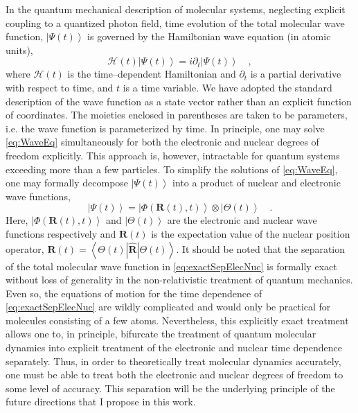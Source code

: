 \documentclass[12pt]{article}
\newcommand{\ket}[1]{\left\vert #1 \right\rangle}         %
\newcommand{\innerop}[3]{\left\langle #1 \left\vert #2 \right\vert #3 \right\rangle}  %
\newcommand*\vc[1]{\boldsymbol{#1}}
\begin{document}
In the quantum mechanical description of molecular systems, neglecting explicit
coupling to a quantized photon field, time evolution of the total molecular wave
function, $\ket{\Psi (t)}$ is governed by the Hamiltonian wave equation 
(in atomic units),
\begin{equation}
\mathscr{H}(t) \ket{\Psi (t)} = i\partial_t \ket{\Psi(t)} \quad,
\label{eq:WaveEq}
\end{equation}
where $\mathscr{H}(t)$ is the time--dependent Hamiltonian and $\partial_t$ is a
partial derivative with respect to time, and $t$ is a time variable. We have
adopted the standard description of the wave function as a state vector rather
than an explicit function of coordinates. The moieties enclosed in parentheses
are taken to be parameters, i.e. the wave function is parameterized by time.
In principle, one may solve \cref{eq:WaveEq} simultaneously for both the 
electronic and nuclear degrees of freedom explicitly. This approach is, however,
intractable for quantum systems exceeding more than a few particles. To simplify
the solutions of \cref{eq:WaveEq}, one may formally decompose $\ket{\Psi (t)}$
into a product of nuclear and electronic wave functions,
\begin{equation} 
\ket{\Psi (t)} = \ket{\Phi(\vc{R}(t),t)}\otimes\ket{\Theta(t)} 
\quad .  
\label{eq:exactSepElecNuc}
\end{equation} 
Here, $\ket{\Phi(\vc{R}(t),t)}$ and $\ket{\Theta (t)}$ are the electronic and
nuclear wave functions respectively and $\vc{R}(t)$ is the expectation value of
the nuclear position operator, $\vc{R}(t) =
\innerop{\Theta(t)}{\hat{\vc{R}}}{\Theta(t)}$.  It should be noted that the
separation of the total molecular wave function in \cref{eq:exactSepElecNuc} is
formally exact\cite{Gross10_PRL123002, Cederbaum08_JCP124101} without loss of
generality in the non-relativistic treatment of quantum mechanics. Even so, the
equations of motion for the time dependence of \cref{eq:exactSepElecNuc} are
wildly complicated\cite{Ghosh15_MP1} and would only be practical for molecules
consisting of a few atoms.  Nevertheless, this explicitly exact treatment allows
one to, in principle, bifurcate the treatment of quantum molecular dynamics into
explicit treatment of the electronic and nuclear time dependence separately.
Thus, in order to theoretically treat molecular dynamics accurately, one must be
able to treat both the electronic and nuclear degrees of freedom to some level
of accuracy.  This separation will be the underlying principle of the future
directions that I propose in this work.
\end{document}
